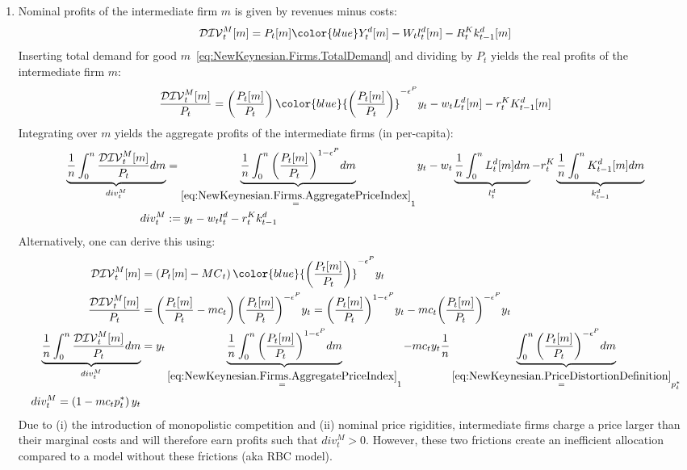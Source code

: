 \begin{enumerate}
\item
Nominal profits of the intermediate firm \(m\) is given by revenues minus costs:
\begin{align*}
\mathcal{DIV}^{M}_{t}[m] =	
P_{t}[m] {\color{blue}Y^{d}_{t}[m]}
 - W_{t} l^{d}_{t}[m]
 - R^{K}_{t} k^{d}_{t-1}[m]
\end{align*}
Inserting total demand for good \(m\)~\eqref{eq:NewKeynesian.Firms.TotalDemand}
  and dividing by \(P_{t}\) yields the real profits of the intermediate firm \(m\):
\begin{align*}
\frac{\mathcal{DIV}^{M}_{t}[m]}{P_{t}}
= \left(\frac{P_{t}[m]}{P_{t}}\right) {\color{blue}{\left(\frac{P_{t}[m]}{P_{t}}\right)}^{-\epsilon^{P}} y_{t}}  - w_{t} L^{d}_{t}[m] - r^{K}_{t} K^{d}_{t-1}[m]
\end{align*}
Integrating over \(m\) yields the aggregate profits of the intermediate firms (in per-capita):
\begin{align*}
\underbrace{\frac{1}{n} \int_{0}^{n} \frac{\mathcal{DIV}^{M}_{t}[m]}{P_{t}} dm}_{div^{M}_{t}}
&= \underbrace{\frac{1}{n} \int_{0}^{n} {\left(\frac{P_{t}[m]}{P_{t}}\right)}^{1-\epsilon^{P}}dm}_{\overset{\eqref{eq:NewKeynesian.Firms.AggregatePriceIndex}}{=}1} y_{t}
- w_{t} \underbrace{\frac{1}{n} \int_{0}^{n} L^{d}_{t}[m] dm}_{l^{d}_{t}}
- r^{K}_{t} \underbrace{\frac{1}{n} \int_{0}^{n} K^{d}_{t-1}[m] dm}_{k^{d}_{t-1}}
\\
div^{M}_{t} &:= y_{t} - w_{t} l^{d}_{t} - r^{K}_{t} k^{d}_{t-1}
\end{align*}
Alternatively, one can derive this using:
\begin{align*}
\mathcal{DIV}^{M}_{t}[m]
&= \left(P_{t}[m] - {MC}_{t}\right) {\color{blue}{\left(\frac{P_{t}[m]}{P_{t}}\right)}^{-\epsilon^{P}} y_{t}}
\\
\frac{\mathcal{DIV}^{M}_{t}[m]}{P_{t}}
&= \left(\frac{P_{t}[m]}{P_{t}} - {mc}_{t}\right) {\left(\frac{P_{t}[m]}{P_{t}}\right)}^{-\epsilon^{P}} y_{t}
= {\left(\frac{P_{t}[m]}{P_{t}}\right)}^{1-\epsilon^{P}} y_{t}
- {mc}_{t} {\left(\frac{P_{t}[m]}{P_{t}}\right)}^{-\epsilon^{P}} y_{t}
\\
\underbrace{\frac{1}{n} \int_{0}^{n} \frac{\mathcal{DIV}^{M}_{t}[m]}{P_{t}}dm}_{div^{M}_{t}}
&= y_{t} \underbrace{\frac{1}{n} \int_{0}^{n} {\left(\frac{P_{t}[m]}{P_{t}}\right)}^{1-\epsilon^{P}} dm}_{\overset{\eqref{eq:NewKeynesian.Firms.AggregatePriceIndex}}{=}1}
- {mc}_{t} y_{t} \frac{1}{n} \underbrace{\int_{0}^{n} {\left(\frac{P_{t}[m]}{P_{t}}\right)}^{-\epsilon^{P}} dm}_{\overset{\eqref{eq:NewKeynesian.PriceDistortionDefinition}}{=}p_{t}^{*}}
\\
div^{M}_{t} = \left(1 - {mc}_{t} p_{t}^{*}\right) y_{t}
\end{align*}
Due to (i) the introduction of monopolistic competition and (ii) nominal price rigidities,
  intermediate firms charge a price larger than their marginal costs
  and will therefore earn profits such that \(div^{M}_{t}>0\).
However, these two frictions create an inefficient allocation compared to a model without these frictions (aka RBC model).


\end{enumerate}
